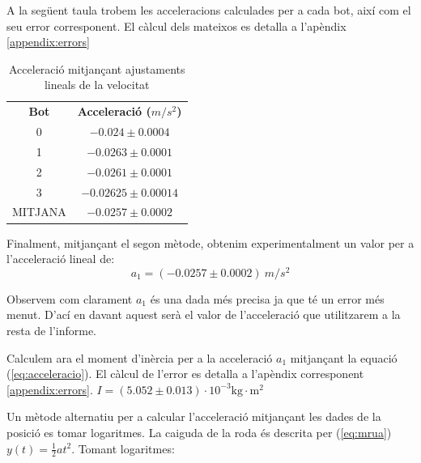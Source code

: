 \documentclass[11pt]{article}
\begin{document}
    \vspace{0.4cm}A la següent taula trobem les acceleracions calculades per a cada bot, així com el seu error corresponent. El càlcul dels mateixos es detalla a l'apèndix \ref{appendix:errors}

    \begin{table}[h]
        \centering
        \begin{tabular}{cc}
            \rowcolor[HTML]{CBCEFB} 
            \textbf{Bot}                   & \textbf{Acceleració ($m/s^2$)}                 \\
            \cellcolor[HTML]{ECF4FF}0      & $-0.024 \pm 0.0004$                            \\
            \rowcolor[HTML]{DAE8FC} 
            1                              & \cellcolor[HTML]{EFEFEF}$-0.0263 \pm 0.0001$   \\
            \cellcolor[HTML]{ECF4FF}2      & $-0.0261 \pm 0.0001$                           \\
            \rowcolor[HTML]{DAE8FC} 
            3                              & \cellcolor[HTML]{EFEFEF}$-0.02625 \pm 0.00014$ \\
            \rowcolor[HTML]{FFFFC7} 
            {\color[HTML]{000000} MITJANA} & {\color[HTML]{000000} $-0.0257 \pm 0.0002$}   
        \end{tabular}
        \label{tab:acc2}
        \caption{Acceleració mitjançant ajustaments lineals de la velocitat}
    \end{table}

    Finalment, mitjançant el segon mètode, obtenim experimentalment un valor per a l'acceleració lineal de: $$\boxed{a_1=(-0.0257\pm0.0002)\ m/s^2}$$

    Observem com clarament $a_1$ és una dada més precisa ja que té un error més menut. D'ací en davant aquest serà el valor de l'acceleració que utilitzarem a la resta de l'informe.
    \clearpage

    Calculem ara el moment d'inèrcia per a la acceleració $a_1$ mitjançant la equació (\ref{eq:acceleracio}). El càlcul de l'error es detalla a l'apèndix corresponent \ref{appendix:errors}. $I=(5.052\pm0.013)\cdot 10^{-3}\si{\kilogram}\cdot\si{\meter}^2$

    \vspace{0.4cm}Un mètode alternatiu per a calcular l'acceleració mitjançant les dades de la posició es tomar logaritmes. La caiguda de la roda és descrita per (\ref{eq:mrua}) $y(t) = \frac12at^2$. Tomant logaritmes:
\end{document}
